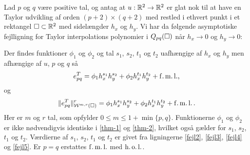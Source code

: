 \begin{theorem} \label{errortheorem}
Lad $p$ og $q$ være positive tal, og antag at $u:\mathbb{R}^2 \rightarrow
\mathbb{R}^2$ er glat nok til at have en Taylor udvikling af orden
$(p+2)\times (q+2)$ med restled i ethvert punkt i et rektangel
$\Box\subset\mathbb{R}^2$ med sidelængder $h_x$ og $h_y$. Vi har da følgende
asymptotiske fejlligning for Taylor interpolations polynomier i
$Q_{pq}(\Box)$ når $h_x \rightarrow 0$ og $h_y \rightarrow 0$:

Der findes funktioner $\phi_1$ og $\phi_2$ og tal $s_1$, $s_2$, $t_1$
og $t_2$ uafhængige af $h_x$ og $h_y$ men afhængige af $u$, $p$ og $q$
så
\begin{equation} \label{thm-1}
  e_{pq}^T = \phi_1 h_x^{s_1} h_y^{s_2} +
  \phi_2 h_x^{t_1}h_y^{t_2} + \operatorname{f.m.l.} ,
\end{equation}
og
\begin{equation} \label{thm-2}
  \|e_{pq}^T\|_{{\mathcal W}^{m,r}(\Box)}^r = \phi_1 h_x^{s_1} h_y^{s_2} +
  \phi_2 h_x^{t_1}h_y^{t_2} + \operatorname{f.m.l.} .
\end{equation}
Her er $m$ og $r$ tal, som opfylder $0\leq m\leq 1+\min \{ p,q \}$.
Funktionerne $\phi_1$ og $\phi_2$ er ikke nødvendigvis identiske i
\eqref{thm-1} og \eqref{thm-2}, hvilket også gælder for $s_1$, $s_2$, $t_1$
og $t_2$. Værdierne af $s_1$, $s_2$, $t_1$ og $t_2$ er givet fra
ligningerne \eqref{fejl2}, \eqref{fejl3}, \eqref{fejl4} og \eqref{fejl5}.
Er $p=q$ erstattes $\operatorname{f.m.l.}$ med $\operatorname{h.o.l.}$.
\end{theorem}

